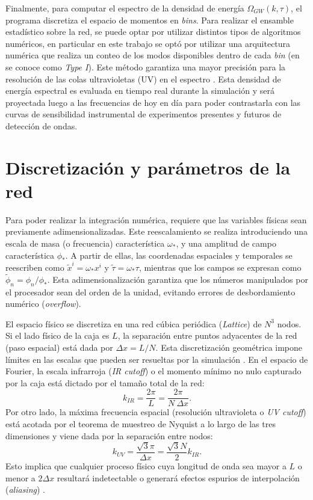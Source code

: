 Finalmente, para computar el espectro de la densidad de energía $\Omega_{GW}(k, \tau)$, el programa discretiza el espacio de momentos en \textit{bins}. Para realizar el ensamble estadístico sobre la red, se puede optar por utilizar distintos tipos de algoritmos numéricos, en particular en este trabajo se optó por utilizar una arquitectura numérica que realiza un conteo de los modos disponibles dentro de cada \textit{bin} (en \CosmoLattice se conoce como \textit{Type I}). Este método garantiza una mayor precisión para la resolución de las colas ultravioletas (UV) en el espectro \cite{CosmoLattice_Note2_GWs}. Esta densidad de energía espectral es evaluada en tiempo real durante la simulación y será proyectada luego a las frecuencias de hoy en día para poder contrastarla con las curvas de sensibilidad instrumental de experimentos presentes y futuros de detección de ondas.

\section{Discretización y parámetros de la red}

Para poder realizar la integración numérica, \CosmoLattice requiere que las variables físicas sean previamente adimensionalizadas. Este reescalamiento se realiza introduciendo una escala de masa (o frecuencia) característica $\omega_*$, y una amplitud de campo característica $\phi_*$. A partir de ellas, las coordenadas espaciales y temporales se reescriben como $\tilde{x}^i = \omega_* x^i$ y $\tilde{\tau} = \omega_* \tau$, mientras que los campos se expresan como $\tilde{\phi}_n = \phi_n / \phi_*$. Esta adimensionalización garantiza que los números manipulados por el procesador sean del orden de la unidad, evitando errores de desbordamiento numérico (\textit{overflow}).

El espacio físico se discretiza en una red cúbica periódica (\textit{Lattice}) de $N^3$ nodos. Si el lado físico de la caja es $L$, la separación entre puntos adyacentes de la red (paso espacial) está dada por $\Delta x = L / N$. Esta discretización geométrica impone límites en las escalas que pueden ser resueltas por la simulación \cite{Khlebnikov_1996, Prokopec_1997}. En el espacio de Fourier, la escala infrarroja (\textit{IR cutoff}) o el momento mínimo no nulo capturado por la caja está dictado por el tamaño total de la red:
\begin{equation}
    k_{IR} = \frac{2\pi}{L} = \frac{2\pi}{N ~ \Delta x}.
\end{equation}
Por otro lado, la máxima frecuencia espacial (resolución ultravioleta o \textit{UV cutoff}) está acotada por el teorema de muestreo de Nyquist a lo largo de las tres dimensiones y viene dada por la separación entre nodos:
\begin{equation}
    k_{UV} = \frac{\sqrt{3} \pi}{\Delta x} = \frac{\sqrt{3} N}{2} k_{IR}.
\end{equation}
Esto implica que cualquier proceso físico cuya longitud de onda sea mayor a $L$ o menor a $2\Delta x$ resultará indetectable o generará efectos espurios de interpolación (\textit{aliasing}) \cite{Figueroa2021}.

